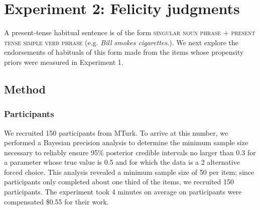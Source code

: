 \documentclass[10pt,letterpaper]{article}
\newcommand{\ndg}[1]{\textcolor{Green}{[ndg: #1]}}
\newcommand{\mht}[1]{\textcolor{DarkOrange}{[mht: #1]}}
\begin{document}



\section{Experiment 2: Felicity judgments}
A present-tense habitual sentence is of the form \textsc{singular noun phrase} $+$ \textsc{present tense simple verb phrase} (e.g. \emph{Bill smokes cigarettes.}).  
We next explore the endorsements of habituals of this form made from the items whose propensity priors were measured in Experiment 1. 

\subsection{Method}

\subsubsection{Participants}

We recruited 150 participants from MTurk.%
To arrive at this number, we performed a Bayesian precision analysis to determine the minimum sample size necessary to reliably ensure 95\% posterior credible intervals no larger than 0.3 for a parameter whose true value is 0.5 and for which the data is a 2 alternative forced choice. This analysis revealed a minimum sample size of 50 per item; since participants only completed about one third of the items, we recruited 150 participants.
The experiment took 4 minutes on average on participants were compensated \$0.55 for their work.
\end{document}
